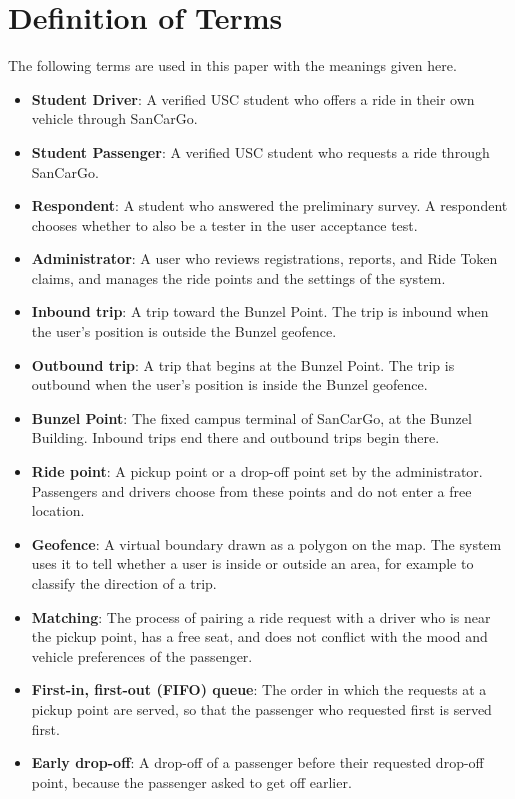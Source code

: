\section{Definition of Terms}\label{sec:terms}
The following terms are used in this paper with the meanings given here.
\begin{itemize}
    \item \textbf{Student Driver}: A verified USC student who offers a ride in their own vehicle through SanCarGo.
    \item \textbf{Student Passenger}: A verified USC student who requests a ride through SanCarGo.
    \item \textbf{Respondent}: A student who answered the preliminary survey. A respondent chooses whether to also be a tester in the user acceptance test.
    \item \textbf{Administrator}: A user who reviews registrations, reports, and Ride Token claims, and manages the ride points and the settings of the system.
    \item \textbf{Inbound trip}: A trip toward the Bunzel Point. The trip is inbound when the user's position is outside the Bunzel geofence.
    \item \textbf{Outbound trip}: A trip that begins at the Bunzel Point. The trip is outbound when the user's position is inside the Bunzel geofence.
    \item \textbf{Bunzel Point}: The fixed campus terminal of SanCarGo, at the Bunzel Building. Inbound trips end there and outbound trips begin there.
    \item \textbf{Ride point}: A pickup point or a drop-off point set by the administrator. Passengers and drivers choose from these points and do not enter a free location.
    \item \textbf{Geofence}: A virtual boundary drawn as a polygon on the map. The system uses it to tell whether a user is inside or outside an area, for example to classify the direction of a trip.
    \item \textbf{Matching}: The process of pairing a ride request with a driver who is near the pickup point, has a free seat, and does not conflict with the mood and vehicle preferences of the passenger.
    \item \textbf{First-in, first-out (FIFO) queue}: The order in which the requests at a pickup point are served, so that the passenger who requested first is served first.
    \item \textbf{Early drop-off}: A drop-off of a passenger before their requested drop-off point, because the passenger asked to get off earlier.

\end{itemize}
